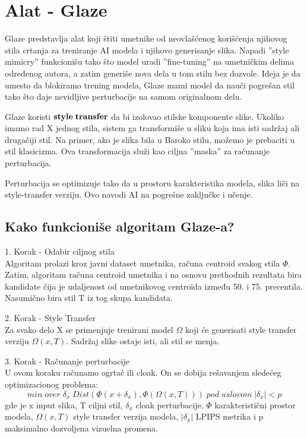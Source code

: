 \section{Alat - Glaze}
\label{sec:alati_id}
\setlength{\intextsep}{10pt}
\setcounter{equation}{0}

    Glaze predstavlja alat koji štiti umetnike od neovlašćenog korišćenja njihovog stila crtanja za treniranje AI modela i njihovo generisanje slika. Napadi ''style mimicry'' funkcionišu tako što model uradi ''fine-tuning'' na umetničkim delima određenog autora, a zatim generiše nova dela u tom stilu bez dozvole. Ideja je da umesto da blokiramo trening modela, Glaze mami model da nauči pogrešan stil tako što daje nevidljive perturbacije na samom originalnom delu.

    Glaze koristi $\bold{style \;transfer}$ da bi izolovao stilske komponente slike. Ukoliko imamo rad X jednog stila, sistem ga transformiše u sliku koja ima isti sadržaj ali drugačiji stil. Na primer, ako je slika bila u Baroko stilu, možemo je prebaciti u stil klasicizma. Ova transformacija služi kao ciljna ''maska'' za računanje perturbacija. 

    Perturbacija se optimizuje tako da u prostoru karakteristika modela, slika liči na style-transfer verziju. Ovo navodi AI na pogrešne zaključke i učenje.

\subsection{Kako funkcioniše algoritam Glaze-a?}
    1. Korak - Odabir ciljnog stila\\
    Algoritam prolazi kroz javni dataset umetnika, računa centroid svakog stila $\Phi$. Zatim, algoritam računa centroid umetnika i na osnovu prethodnih rezultata bira kandidate čija je udaljenost od umetnikovog centroida između 50. i 75. precentila. Nasumično bira stil T iz tog skupa kandidata. 

    2. Korak - Style Transfer\\
    Za svako delo X se primenjuje trenirani model $\Omega$ koji će generisati style transfer verziju $\Omega(x, T)$. Sadržaj slike ostaje isti, ali stil se menja.

    3. Korak - Računanje perturbacije\\
    U ovom koraku računamo ogrtač ili cloak. On se dobija rešavanjem sledećeg optimizacionog problema:
    \begin{equation}
        min \; over \; \delta_x \; {Dist(\Phi(x+\delta_x), \Phi(\Omega(x, T)))} \; pod \; uslovom \; |\delta_x| < p
    \end{equation}
     gde je x input slika, T ciljni stil, $\delta_x$ cloak perturbacije, $\Phi$ karakteristični prostor modela, $\Omega(x, T)$ style transfer verzija modela, $|\delta_x|$ LPIPS metrika i p maksimalno dozvoljena vizuelna promena. 

